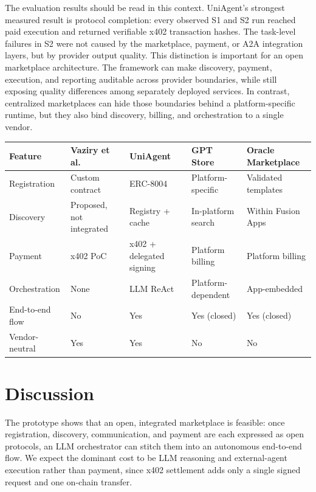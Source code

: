 \documentclass[sigconf]{acmart}
\begin{document}
The evaluation results should be read in this context. UniAgent's
strongest measured result is protocol completion: every observed S1 and
S2 run reached paid execution and returned verifiable x402 transaction
hashes. The task-level failures in S2 were not caused by the marketplace,
payment, or A2A integration layers, but by provider output quality. This
distinction is important for an open marketplace architecture. The
framework can make discovery, payment, execution, and reporting
auditable across provider boundaries, while still exposing quality
differences among separately deployed services. In contrast, centralized
marketplaces can hide those boundaries behind a platform-specific
runtime, but they also bind discovery, billing, and orchestration to a
single vendor.

\begin{strip}
  \centering
  \label{tab:comparison}
  \small
  \begin{tabular}{@{}p{}p{}p{}p{}p{}@{}}
    \toprule
    Feature & Vaziry et al. & UniAgent & GPT Store & Oracle Marketplace \\
    \midrule
    Registration & Custom contract & ERC-8004 & Platform-specific & Validated templates \\
    Discovery & Proposed, not integrated & Registry + cache & In-platform search & Within Fusion Apps \\
    Payment & x402 PoC & x402 + delegated signing & Platform billing & Platform billing \\
    Orchestration & None & LLM ReAct & Platform-dependent & App-embedded \\
    End-to-end flow & No & Yes & Yes (closed) & Yes (closed) \\
    Vendor-neutral & Yes & Yes & No & No \\
    \bottomrule
  \end{tabular}
\end{strip}

\section{Discussion}
\label{sec:discussion}

The prototype shows that an open, integrated marketplace is feasible:
once registration, discovery, communication, and payment are each
expressed as open protocols, an LLM orchestrator can stitch them into an
autonomous end-to-end flow. We expect the dominant cost to be LLM
reasoning and external-agent execution rather than payment, since x402
settlement adds only a single signed request and one on-chain transfer.
\end{document}
